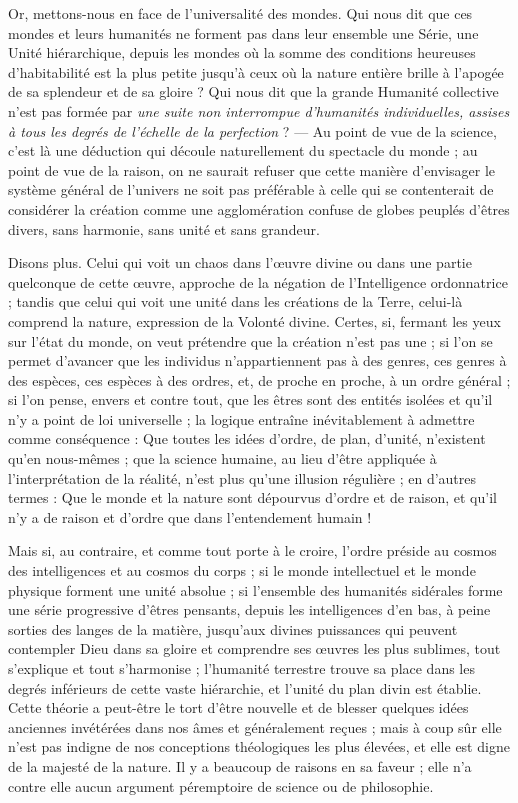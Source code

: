 \documentclass[a4paper, 11pt, oneside]{article}
\begin{document}
Or, mettons-nous en face de l'universalité des mondes. Qui nous dit que ces mondes et leurs humanités ne forment pas dans leur ensemble une Série, une Unité hiérarchique, depuis les mondes où la somme des conditions heureuses d'habitabilité est la plus petite jusqu'à ceux où la nature entière brille à l'apogée de sa splendeur et de sa gloire ? Qui nous dit que la grande Humanité collective n'est pas formée par \emph{une suite non interrompue d'humanités individuelles, assises à tous les degrés de l'échelle de la perfection} ? --- Au point de vue de la science, c'est là une déduction qui découle naturellement du spectacle du monde ; au point de vue de la raison, on ne saurait refuser que cette manière d'envisager le système général de l'univers ne soit pas préférable à celle qui se contenterait de considérer la création comme une agglomération confuse de globes peuplés d'êtres divers, sans harmonie, sans unité et sans grandeur.

Disons plus. Celui qui voit un chaos dans l'œuvre divine ou dans une partie quelconque de cette œuvre, approche de la négation de l'Intelligence ordonnatrice ; tandis que celui qui voit une unité dans les créations de la Terre, celui-là comprend la nature, expression de la Volonté divine. Certes, si, fermant les yeux sur l'état du monde, on veut prétendre que la création n'est pas une ; si l'on se permet d'avancer que les individus n'appartiennent pas à des genres, ces genres à des espèces, ces espèces à des ordres, et, de proche en proche, à un ordre général ; si l'on pense, envers et contre tout, que les êtres sont des entités isolées et qu'il n'y a point de loi universelle ; la logique entraîne inévitablement à admettre comme conséquence : Que toutes les idées d'ordre, de plan, d'unité, n'existent qu'en nous-mêmes ; que la science humaine, au lieu d'être appliquée à l'interprétation de la réalité, n'est plus qu'une illusion régulière ; en d'autres termes : Que le monde et la nature sont dépourvus d'ordre et de raison, et qu'il n'y a de raison et d'ordre que dans l'entendement humain !

Mais si, au contraire, et comme tout porte à le croire, l'ordre préside au cosmos des intelligences et au cosmos du corps ; si le monde intellectuel et le monde physique forment une unité absolue ; si l'ensemble des humanités sidérales forme une série progressive d'êtres pensants, depuis les intelligences d'en bas, à peine sorties des langes de la matière, jusqu'aux divines puissances qui peuvent contempler Dieu dans sa gloire et comprendre ses œuvres les plus sublimes, tout s'explique et tout s'harmonise ; l'humanité terrestre trouve sa place dans les degrés inférieurs de cette vaste hiérarchie, et l'unité du plan divin est établie. Cette théorie a peut-être le tort d'être nouvelle et de blesser quelques idées anciennes invétérées dans nos âmes et généralement reçues ; mais à coup sûr elle n'est pas indigne de nos conceptions théologiques les plus élevées, et elle est digne de la majesté de la nature. Il y a beaucoup de raisons en sa faveur ; elle n'a contre elle aucun argument péremptoire de science ou de philosophie.
\end{document}
